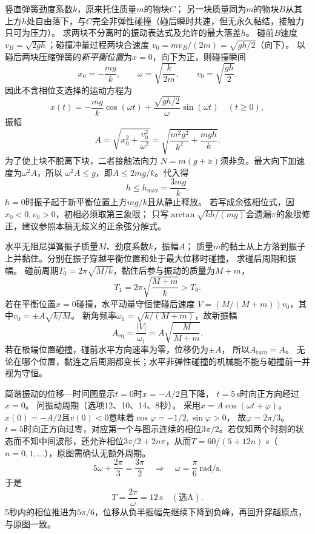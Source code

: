 

\problemtext 竖直弹簧劲度系数$k$，原来托住质量$m$的物块$C$；
另一块质量同为$m$的物块$B$从其上方$h$处自由落下，与$C$完全非弹性碰撞（碰后瞬时共速，但无永久黏结，接触力只可为压力）。
求两块不分离时的振动表达式及允许的最大落差$h$。
\workings
碰前$B$速度$v_B=\sqrt{2gh}$；碰撞冲量过程两块合速度
$v_0=mv_B/(2m)=\sqrt{gh/2}$（向下）。
以碰后两块压缩弹簧的\emph{新平衡位置}为$x=0$，向下为正，则碰撞瞬间
\[
x_0=-\frac{mg}{k},\qquad
\omega=\sqrt{\frac{k}{2m}},\qquad v_0=\sqrt{\frac{gh}{2}}.
\]
因此不含相位支选择的运动方程为
\[
\boxed{x(t)=-\frac{mg}{k}\cos(\omega t)
       +\frac{\sqrt{gh/2}}{\omega}\sin(\omega t)}
\quad(t\ge0),
\]
振幅
\[
\boxed{A=\sqrt{x_0^2+\frac{v_0^2}{\omega^2}}
=\sqrt{\frac{m^2g^2}{k^2}+\frac{mgh}{k}}}.
\]
为了使上块不脱离下块，二者接触法向力
$N=m(g+\ddot x)$须非负。最大向下加速度为$\omega^2A$，所以
$\omega^2A\le g$，即$A\le2mg/k$。代入得
\[
\boxed{h\le h_{\max}=\frac{3mg}{k}}.
\]
\crosscheck $h=0$时振子起于新平衡位置上方$mg/k$且从静止释放。
若写成余弦相位式，因$x_0<0,v_0>0$，初相必须取第三象限；
只写$\arctan\sqrt{kh/(mg)}$会遗漏$\pi$的象限修正，建议参照本稿无歧义的正余弦分解式。

\problemtext 水平无阻尼弹簧振子质量$M$、劲度系数$k$，振幅$A$；
质量$m$的黏土从上方落到振子上并黏住。分别在振子穿越平衡位置和处于最大位移时碰撞，
求碰后周期和振幅。
\workings
碰前周期$T_0=2\pi\sqrt{M/k}$，黏住后参与振动的质量为$M+m$，
\[
\boxed{T_1=2\pi\sqrt{\frac{M+m}{k}}>T_0}.
\]
若在平衡位置$x=0$碰撞，水平动量守恒使碰后速度
$V=(M/(M+m))v_0$，其中$v_0=\pm A\sqrt{k/M}$。
新角频率$\omega_1=\sqrt{k/(M+m)}$，故新振幅
\[
\boxed{A_{\mathrm{eq}}=\frac{|V|}{\omega_1}
=A\sqrt{\frac{M}{M+m}}}.
\]
若在极端位置碰撞，碰前水平方向速率为零，位移仍为$\pm A$，
所以$\boxed{A_{\mathrm{turn}}=A}$。
\crosscheck 无论在哪个位置，黏连之后周期都变长；水平非弹性碰撞的机械能不能与碰撞前一并视为守恒。

\problemtext 简谐振动的位移—时间图显示$t=0$时$x=-A/2$且下降，
$t=5\,\mathrm s$时向正方向经过$x=0$。
问振动周期（选项12、10、14、8秒）。
\workings
采用$x=A\cos(\omega t+\varphi)$。
$x(0)=-A/2$且$v(0)<0$意味着$\cos\varphi=-1/2,\sin\varphi>0$，
故$\varphi=2\pi/3$。
$t=5$时向正方向过零，对应第一个与图示连续的相位$3\pi/2$。若仅知两个时刻的状态而不知中间波形，还允许相位$3\pi/2+2n\pi$，从而$T=60/(5+12n)$ s（$n=0,1,\ldots$），原图需确认无额外周期。
\[
5\omega+\frac{2\pi}{3}=\frac{3\pi}{2}
\quad\Longrightarrow\quad
\omega=\frac{\pi}{6}\ \mathrm{rad/s}.
\]
于是
\[
\boxed{T=\frac{2\pi}{\omega}=12\,\mathrm s}\quad(\text{选A}).
\]
\crosscheck 5秒内的相位推进为$5\pi/6$，位移从负半振幅先继续下降到负峰，再回升穿越原点，与原图一致。

